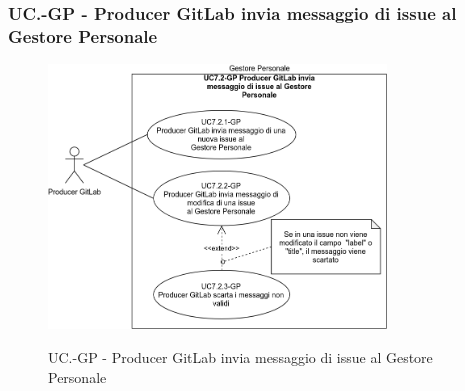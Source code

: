 	\subsubsection{UC\theuccount.\thesubuccount-GP -  Producer GitLab invia messaggio di issue al Gestore Personale}
		\begin{figure}[H]
			\centering
			\includegraphics[width=0.8\textwidth]{img/casi_d'uso/UC7_2.png}\\
			\caption{UC\theuccount.\thesubuccount-GP -  Producer GitLab invia messaggio di issue al Gestore Personale}
		\end{figure}
